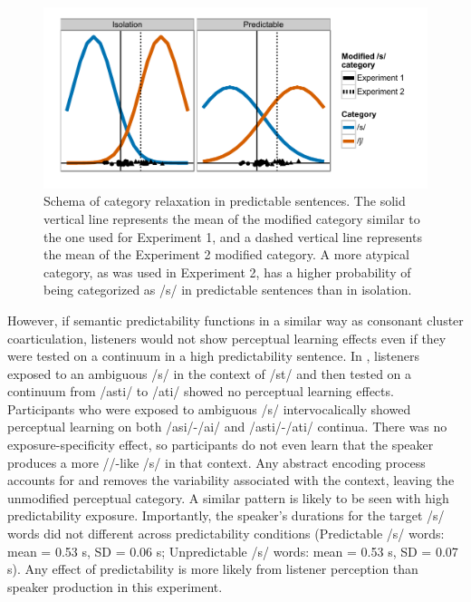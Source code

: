 \begin{figure}[!ht]
\centering
\caption{Schema of category relaxation in predictable sentences.  The solid vertical line represents the mean of the modified category similar to the one used for Experiment 1, and a dashed vertical line represents the mean of the Experiment 2 modified category.  A more atypical category, as was used in Experiment 2, has a higher probability of being categorized as /s/ in predictable sentences than in isolation.}
\label{fig:distPred}
\begin{center}
\includegraphics[width=\textwidth]{graphs/distPred}
\end{center}
\end{figure}

However, if semantic predictability functions in a similar way as consonant cluster coarticulation, listeners would not show perceptual learning effects even if they were tested on a continuum in a high predictability sentence.
In \citet{Kraljic2008a}, listeners exposed to an ambiguous /s/ in the context of /st\textturnr/ and then tested on a continuum from /ast\textturnr i/ to /a\textesh t\textturnr i/ showed no perceptual learning effects.
Participants who were exposed to ambiguous /s/ intervocalically showed perceptual learning on both /asi/-/a\textesh i/ and /ast\textturnr i/-/a\textesh t\textturnr i/ continua.
There was no exposure-specificity effect, so participants do not even learn that the speaker produces a more /\textesh/-like /s/ in that context.
Any abstract encoding process accounts for and removes the variability associated with the context, leaving the unmodified perceptual category.
A similar pattern is likely to be seen with high predictability exposure.
Importantly, the speaker's durations for the target /s/ words did not different across predictability conditions (Predictable /s/ words: mean = 0.53 s, SD = 0.06 s; Unpredictable /s/ words: mean = 0.53 s, SD = 0.07 s).
Any effect of predictability is more likely from listener perception than speaker production in this experiment.

